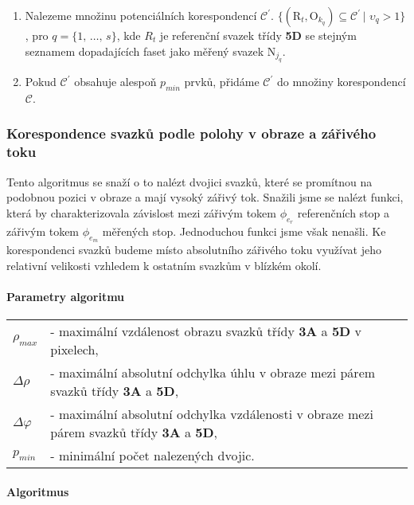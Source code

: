 \begin{enumerate}
\item Nalezeme množinu potenciálních korespondencí $\mathcal{C^\prime}$. $\lbrace \left(\mathrm{R}_t,\mathrm{O}_{k_q}\right) \subseteq \mathcal{C^\prime} \,|\,\, \upsilon_q > 1 \rbrace$, pro $q = \lbrace1,\,\dots,\,s\rbrace$, kde $R_t$ je referenční svazek třídy \textbf{5D} se stejným seznamem dopadajících faset jako měřený svazek $\mathrm{N}_{j_q}$.

\item Pokud $\mathcal{C^\prime}$ obsahuje alespoň $p_{min}$ prvků, přidáme $\mathcal{C^\prime}$ do množiny korespondencí $\mathcal{C}$.

 
\end{enumerate}

\newpage
\subsubsection{Korespondence svazků podle polohy v obraze a zářivého toku}
	Tento algoritmus se snaží o to nalézt dvojici svazků, které se promítnou na podobnou pozici v obraze a mají vysoký zářivý tok. Snažili jsme se nalézt funkci, která by charakterizovala závislost mezi zářivým tokem $\phi_{e_{r}}$ referenčních stop a zářivým tokem $\phi_{e_{m}}$ měřených stop. Jednoduchou funkci jsme však nenašli. Ke korespondenci svazků budeme místo absolutního zářivého toku využívat jeho relativní velikosti vzhledem k ostatním svazkům v blízkém okolí. 

\paragraph{Parametry algoritmu}
\hspace{1mm}

	 \begin{tabular}{l l}
	 $\rho_{max}$ & - maximální vzdálenost obrazu svazků třídy \textbf{3A} a \textbf{5D} v pixelech,\\
	 $\Delta\rho$ & - maximální absolutní odchylka úhlu v obraze mezi párem svazků třídy \textbf{3A} a \textbf{5D},\\
	 $\Delta\varphi$ & - maximální absolutní odchylka vzdálenosti v obraze mezi párem svazků třídy \textbf{3A} a \textbf{5D},\\
	 $p_{min}$ & - minimální počet nalezených dvojic.\\
	 \end{tabular}

\paragraph{Algoritmus}


